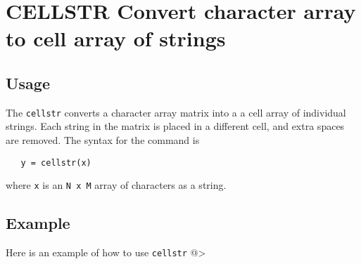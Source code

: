 \section{CELLSTR Convert character array to cell array of strings}

\subsection{Usage}

The \verb|cellstr| converts a character array matrix into a 
a cell array of individual strings.  Each string in
the matrix is placed in a different cell, and extra spaces
are removed.  The syntax for the command is
\begin{verbatim}
   y = cellstr(x)
\end{verbatim}
where \verb|x| is an \verb|N x M| array of characters as a string.
\subsection{Example}

Here is an example of how to use \verb|cellstr|
@>
